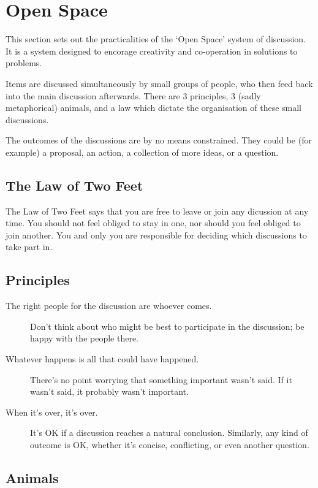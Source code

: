 \documentclass[a4paper, 11pt]{article} %
\begin{document}
\appendix

\section{Open Space}
\label{sec:openspace}
This section sets out the practicalities of the `Open Space' system of discussion.  It is a system designed to encorage creativity and co-operation in solutions to problems.

Items are discussed simultaneously by small groups of people, who then feed back into the main discussion afterwards.  There are 3 principles, 3 (sadly metaphorical) animals, and a law which dictate the organisation of these small discussions.

The outcomes of the discussions are by no means constrained.  They could be (for example) a proposal, an action, a collection of more ideas, or a question.

\subsection{The Law of Two Feet}
The Law of Two Feet says that you are free to leave or join any dicussion at any time.  You should not feel obliged to stay in one, nor should you feel obliged to join another.  You and only you are responsible for deciding which discussions to take part in.

\subsection{Principles}
\begin{description}
\item[The right people for the discussion are whoever comes.]  Don't think about who might be best to participate in the discussion; be happy with the people there.
\item[Whatever happens is all that could have happened.]  There's no point worrying that something important wasn't said.  If it wasn't said, it probably wasn't important.
\item[When it's over, it's over.]  It's OK if a discussion reaches a natural conclusion.  Similarly, any kind of outcome is OK, whether it's concise, conflicting, or even another question.
\end{description}

\subsection{Animals}
\end{document}

